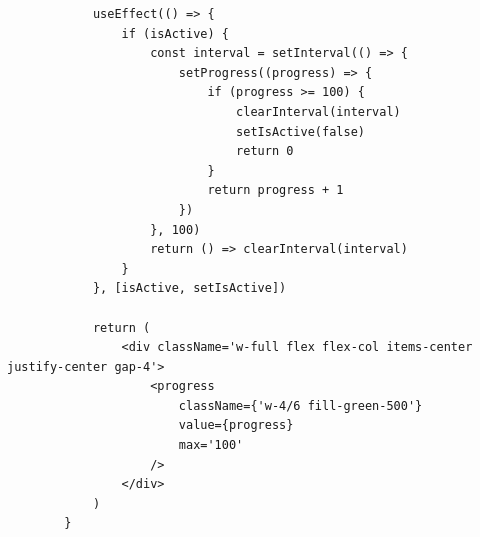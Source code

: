 \begin{center}
\begin{verbatim}
            useEffect(() => {
                if (isActive) {
                    const interval = setInterval(() => {
                        setProgress((progress) => {
                            if (progress >= 100) {
                                clearInterval(interval)
                                setIsActive(false)
                                return 0
                            }
                            return progress + 1
                        })
                    }, 100)
                    return () => clearInterval(interval)
                }
            }, [isActive, setIsActive])

            return (
                <div className='w-full flex flex-col items-center justify-center gap-4'>
                    <progress
                        className={'w-4/6 fill-green-500'}
                        value={progress}
                        max='100'
                    />
                </div>
            )
        }
    \end{verbatim}
\end{center}

\newpage
